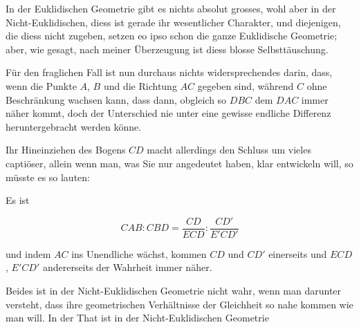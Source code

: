 %
In der Euklidischen Geometrie gibt es nichts absolut grosses, wohl aber in der Nicht-Euklidischen, diess ist gerade ihr wesentlicher Charakter, und diejenigen, die diess nicht zugeben, setzen eo ipso schon die ganze Euklidische Geometrie; aber, wie gesagt, nach meiner Überzeugung ist diess blosse Selbsttäuschung.

Für den fraglichen Fall ist nun durchaus nichts widersprechendes darin, dass, wenn die Punkte $A$, $B$ und die Richtung $AC$ gegeben sind, während $C$ ohne Beschränkung wachsen kann, dass dann, obgleich so $DBC$ dem $DAC$ immer näher kommt, doch der Unterschied nie unter eine gewisse endliche Differenz heruntergebracht werden könne.

\begin{center}

\end{center}

\Needspace{9cm}
 Ihr Hineinziehen des Bogens $CD$ macht allerdings den Schluss um vieles captiöser, allein wenn man, was Sie nur angedeutet haben, klar entwickeln will, so müsste es so lauten:

\begin{center}

\end{center}

Es ist

\[
CAB:CBD=\frac{CD}{ECD}:\frac{CD'}{E'CD'}
\]

\noindent und indem $AC$ ins Unendliche wächst, kommen $CD$ und $CD'$ einerseits und $ECD$, $E'CD'$ andererseits der Wahrheit immer näher.

Beides ist in der Nicht-Euklidischen Geometrie nicht wahr, wenn man darunter versteht, dass ihre geometrischen Verhältnisse der Gleichheit so nahe kommen wie man will. In der That ist in der Nicht-Euklidischen Geometrie
